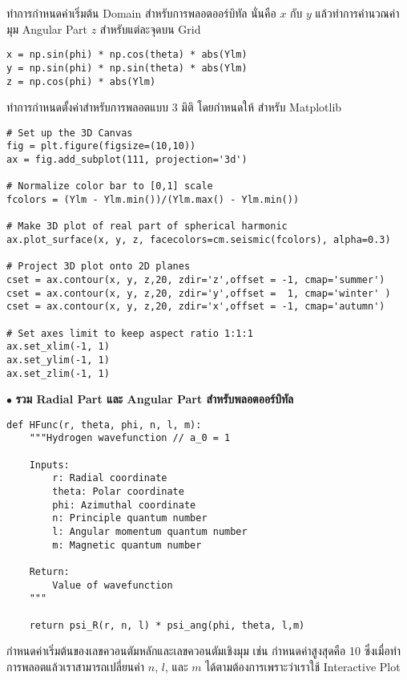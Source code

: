\noindent ทำการกำหนดค่าเริ่มต้น Domain สำหรับการพลอตออร์บิทัล นั่นคือ $x$ กับ $y$ แล้วทำการคำนวณค่ามุม Angular Part $z$ 
สำหรับแต่ละจุดบน Grid

\begin{lstlisting}[style=MyPython]
x = np.sin(phi) * np.cos(theta) * abs(Ylm)
y = np.sin(phi) * np.sin(theta) * abs(Ylm)
z = np.cos(phi) * abs(Ylm)
\end{lstlisting}

\noindent ทำการกำหนดตั้งค่าสำหรับการพลอตแบบ 3 มิติ โดยกำหนดให้  สำหรับ Matplotlib

\begin{lstlisting}[style=MyPython]
# Set up the 3D Canvas
fig = plt.figure(figsize=(10,10))
ax = fig.add_subplot(111, projection='3d')

# Normalize color bar to [0,1] scale
fcolors = (Ylm - Ylm.min())/(Ylm.max() - Ylm.min())

# Make 3D plot of real part of spherical harmonic
ax.plot_surface(x, y, z, facecolors=cm.seismic(fcolors), alpha=0.3)

# Project 3D plot onto 2D planes
cset = ax.contour(x, y, z,20, zdir='z',offset = -1, cmap='summer')
cset = ax.contour(x, y, z,20, zdir='y',offset =  1, cmap='winter' )
cset = ax.contour(x, y, z,20, zdir='x',offset = -1, cmap='autumn')

# Set axes limit to keep aspect ratio 1:1:1
ax.set_xlim(-1, 1)
ax.set_ylim(-1, 1)
ax.set_zlim(-1, 1)
\end{lstlisting}

$\bullet$ \textbf{รวม Radial Part และ Angular Part สำหรับพลอตออร์บิทัล}

\begin{lstlisting}[style=MyPython]
def HFunc(r, theta, phi, n, l, m):
    """Hydrogen wavefunction // a_0 = 1

    Inputs:
        r: Radial coordinate
        theta: Polar coordinate
        phi: Azimuthal coordinate
        n: Principle quantum number
        l: Angular momentum quantum number
        m: Magnetic quantum number

    Return:
        Value of wavefunction
    """

    return psi_R(r, n, l) * psi_ang(phi, theta, l,m)
\end{lstlisting}

\noindent กำหนดค่าเริ่มต้นของเลขควอนตัมหลักและเลขควอนตัมเชิงมุม เช่น กำหนดค่าสูงสุดคือ 10 ซึ่งเมื่อทำการพลอตแล้วเราสามารถเปลี่ยนค่า
$n$, $l$, และ $m$ ได้ตามต้องการเพราะว่าเราใช้ Interactive Plot

